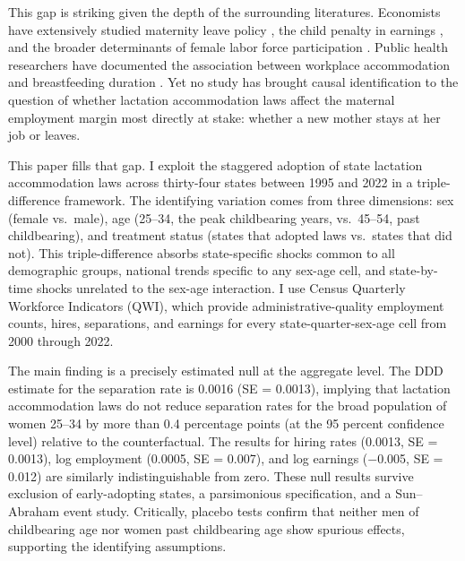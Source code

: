\documentclass[12pt]{article}
\begin{document}
This gap is striking given the depth of the surrounding literatures. Economists have extensively studied maternity leave policy \citep{baker2008, rossin2011, stearns2015, rossinslater2018}, the child penalty in earnings \citep{kleven2019, angelov2016}, and the broader determinants of female labor force participation \citep{goldin2014, blau2017, bertrand2010}. Public health researchers have documented the association between workplace accommodation and breastfeeding duration \citep{guendelman2009, hawkins2007, tsai2016}. Yet no study has brought causal identification to the question of whether lactation accommodation laws affect the maternal employment margin most directly at stake: whether a new mother stays at her job or leaves.

This paper fills that gap. I exploit the staggered adoption of state lactation accommodation laws across thirty-four states between 1995 and 2022 in a triple-difference framework. The identifying variation comes from three dimensions: sex (female vs.\ male), age (25--34, the peak childbearing years, vs.\ 45--54, past childbearing), and treatment status (states that adopted laws vs.\ states that did not). This triple-difference absorbs state-specific shocks common to all demographic groups, national trends specific to any sex-age cell, and state-by-time shocks unrelated to the sex-age interaction. I use Census Quarterly Workforce Indicators (QWI), which provide administrative-quality employment counts, hires, separations, and earnings for every state-quarter-sex-age cell from 2000 through 2022.

The main finding is a precisely estimated null at the aggregate level. The DDD estimate for the separation rate is 0.0016 (SE = 0.0013), implying that lactation accommodation laws do not reduce separation rates for the broad population of women 25--34 by more than 0.4 percentage points (at the 95 percent confidence level) relative to the counterfactual. The results for hiring rates (0.0013, SE = 0.0013), log employment (0.0005, SE = 0.007), and log earnings ($-$0.005, SE = 0.012) are similarly indistinguishable from zero. These null results survive exclusion of early-adopting states, a parsimonious specification, and a Sun--Abraham event study. Critically, placebo tests confirm that neither men of childbearing age nor women past childbearing age show spurious effects, supporting the identifying assumptions.
\end{document}
